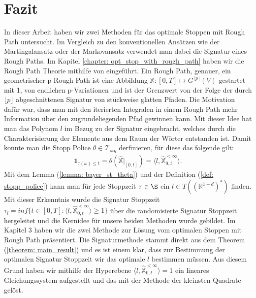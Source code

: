 \documentclass[12pt,titlepage,headsepline]{article}
\begin{document}
        \newpage

    \section{Fazit}
      In dieser Arbeit haben wir zwei Methoden für das optimale Stoppen mit Rough Path untersucht. Im Vergleich zu den konventionellen Ansätzen wie der Martingalansatz oder der Markovansatz verwendet man dabei die Signatur eines Rough Paths.
      \hfill\break
      Im Kapitel \ref{chapter: opt_stop_with_rough_path} haben wir die Rough Path Theorie mithilfe von \cite{bayer_optimal_2020} eingeführt. Ein Rough Path, genauer, ein geometrischer p-Rough Path ist eine Abbildung $\mathbb{X}: [0,T] \mapsto G^{\lfloor p \rfloor}(V)$ gestartet mit 1, von endlichen p-Variationen und ist der Grenzwert von der Folge der durch $\lfloor p \rfloor$ abgeschnittenen Signatur von stückweise glatten Pfaden. Die Motivation dafür war, dass man mit den iterierten Integralen in einem Rough Path mehr Information über den zugrundeliegenden Pfad gewinnen kann. Mit dieser Idee hat man das Polynom $l$ im Bezug zu der Signatur eingebracht, welches durch die Charakterisierung der Elemente aus dem Raum der Wörter entstanden ist. Damit konnte man die Stopp
      Police $\theta \in \mathcal{T}_{sig}$ derfinieren, für diese das folgende gilt:
      \begin{align*}
        \mathds{1}_{\tau(\omega)\leq t}= \theta(\hat{\mathbb{X}}\lvert_{[0,t]}) = \langle l, \hat{\mathbb{X}}_{0,t}^{< \infty} \rangle.
      \end{align*}
      Mit dem Lemma (\ref{lemma: bayer_st_theta}) und der Definition (\ref{def: stopp_police}) kann man für jede Stoppzeit $\tau \in \S$ ein $l \in T((\mathbb{R}^{1+d})^*)$ finden. Mit dieser Erkenntnis wurde die Signatur Stoppzeit
      $\tau_l = inf \{t \in [0,T] : \langle l, \hat{\mathbb{X}}_{0,t}^{< \infty} \rangle \geq 1 \}$ über die randomisierte Signatur Stoppzeit hergeleitet und die Kernidee für unsere beiden Methoden wurde gebildet.
      \hfill\break
      Im Kapitel 3 haben wir die zwei Methode zur Lösung vom optimalen Stoppen mit Rough Path präsentiert. Die Signaturmethode stammt direkt aus dem Theorem (\ref{theorem: main_result}) und es ist einem klar, dass zur Bestimmung der optimalen Signatur Stoppzeit wir das optimale $l$ bestimmen müssen. Aus diesem Grund haben wir mithilfe der Hyperebene $\langle l, \hat{\mathbb{X}}_{0,t}^{< \infty} \rangle = 1$ ein lineares Gleichungssystem aufgestellt und das mit der Methode der kleinsten Quadrate gelöst.
\end{document}
